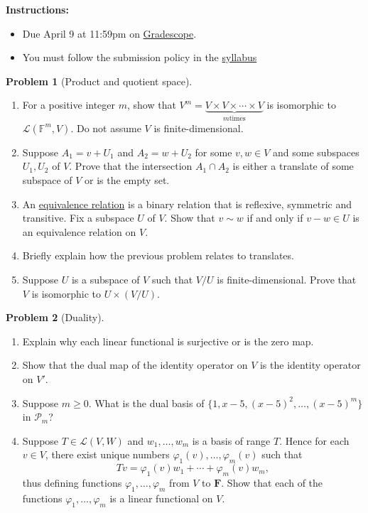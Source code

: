 \documentclass[12pt]{article}
\theoremstyle{definition}
\newtheorem{problem}{Problem}
\begin{document}
\textbf{\Large{}}
    
\vspace{-1.8em}
\hrulefill

\textbf{Instructions:}
    \begin{itemize}
        \item Due April 9 at 11:59pm on \href{https://www.gradescope.com/courses/709136}{Gradescope}.
        \item You must follow the submission policy in the \href{https://courses.chen.pw/la_s2024/syllabus.html}{syllabus} 
\end{itemize}
   
\vspace{.5em}

\begin{problem}[Product and quotient space]~
    \begin{enumerate}
        \item For a positive integer $m$, show that $V^m = \underbrace{V\times V \times \cdots \times V}_{m\text{times}}$ is isomorphic to $\mathcal{L}(\mathbb{F}^m,V)$. Do not assume $V$ is finite-dimensional.
        \item Suppose $A_1=v+U_1$ and $A_2=w+U_2$ for some $v, w \in V$ and some subspaces $U_1, U_2$ of $V$. Prove that the intersection $A_1 \cap A_2$ is either a translate of some subspace of $V$ or is the empty set.
        \item An \href{https://en.wikipedia.org/wiki/Equivalence_relation}{equivalence relation} is a binary relation that is reflexive, symmetric and transitive. Fix a subspace $U$ of $V$. Show that $v\sim w$ if and only if $v-w\in U$ is an equivalence relation on $V$.
        \item Briefly explain how the previous problem relates to translates.
        \item Suppose $U$ is a subspace of $V$ such that $V / U$ is finite-dimensional. Prove that $V$ is isomorphic to $U \times(V / U)$.
    \end{enumerate}
    \end{problem}

\begin{problem}[Duality]~
\begin{enumerate}
    \item Explain why each linear functional is surjective or is the zero map.
    \item Show that the dual map of the identity operator on $V$ is the identity operator
    on $V'$.
    \item Suppose $m\geq 0$. What is the dual basis of $\{1,x-5,(x-5)^2, \ldots, (x-5)^m\}$ in $\mathcal{P}_m$?
    \item Suppose $T \in \mathcal{L}(V, W)$ and $w_1, \ldots, w_m$ is a basis of range $T$. Hence for each $v \in V$, there exist unique numbers $\varphi_1(v), \ldots, \varphi_m(v)$ such that
    $$
    T v=\varphi_1(v) w_1+\cdots+\varphi_m(v) w_m,
    $$
    thus defining functions $\varphi_1, \ldots, \varphi_m$ from $V$ to $\mathbf{F}$. Show that each of the functions $\varphi_1, \ldots, \varphi_m$ is a linear functional on $V$.
\end{enumerate}
\end{problem}
\end{document}
